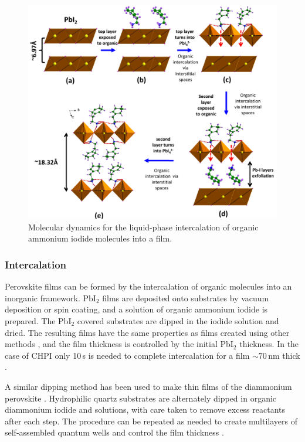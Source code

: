 \begin{figure} [h!]
\centering
\includegraphics[width=\textwidth]{Fig7}
\caption{Molecular dynamics for the liquid-phase intercalation of organic ammonium iodide molecules into a  film.}
\label{2Fig7}
\end{figure}
\subsubsection{Intercalation}
Perovskite films can be formed by the intercalation of organic molecules into an inorganic framework. Pb$\textrm{I}_2$ films are deposited onto substrates by vacuum deposition or spin coating, and a solution of organic ammonium iodide is prepared. The Pb$\textrm{I}_2$ covered substrates are dipped in the iodide solution and dried. The resulting films have the same properties as films created using other methods \cite{Liang1998}, and the film thickness is controlled by the initial Pb$\textrm{I}_2$ thickness. In the case of CHPI only 10\,s is needed to complete intercalation for a film $\sim70$\,nm thick \cite{Pradeesh2009a}.

A similar dipping method has been used to make thin films of the diammonium perovskite \mbox{}. Hydrophilic quartz substrates are alternately dipped in organic diammonium iodide and  solutions, with care taken to remove excess reactants after each step. The procedure can be repeated as needed to create multilayers of self-assembled quantum wells and control the film thickness \cite{Matsui2002}.


